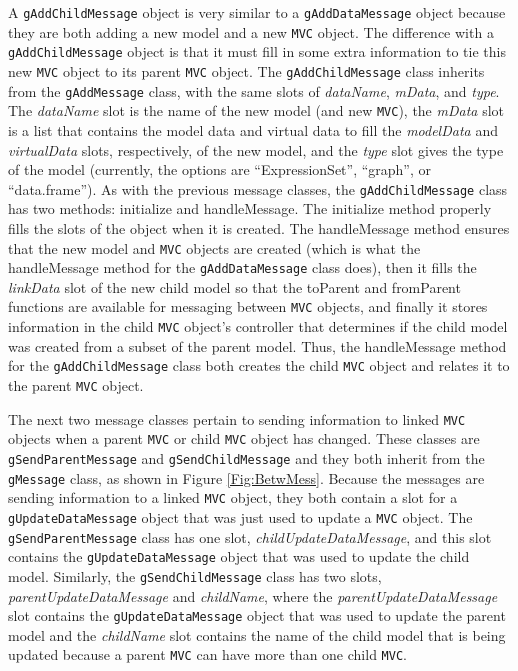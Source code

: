 \documentclass{article}[11pt]
\newcommand{\Rfunction}[1]{{\textsf{#1}}}
\newcommand{\Robject}[1]{{\texttt{#1}}}
\newcommand{\Rslot}[1]{\textsl{#1}}
\newcommand{\Rclass}[1]{\texttt{#1}}
\begin{document}
A \Robject{gAddChildMessage} object is very 
similar to a \Robject{gAddDataMessage} object because they are both adding a
new model and a new \Robject{MVC} object.  The difference with a
\Robject{gAddChildMessage} object is that it must fill in some extra
information to tie this new \Robject{MVC} object to its parent \Robject{MVC}
object.  The \Rclass{gAddChildMessage} class inherits from the
\Rclass{gAddMessage} class, with the same slots of \Rslot{dataName},
\Rslot{mData}, and \Rslot{type}.  The \Rslot{dataName} slot is the name of the
new model (and new \Robject{MVC}), the \Rslot{mData} slot is a list that
contains the model data and virtual data to fill the \Rslot{modelData} and
\Rslot{virtualData} slots, respectively, of the new model, and the
\Rslot{type} slot gives the type of the model (currently, the options are
``ExpressionSet'', ``graph'', or ``data.frame'').  As with the previous
message classes, the \Rclass{gAddChildMessage} class has two methods:
\Rfunction{initialize} and \Rfunction{handleMessage}.  The
\Rfunction{initialize} method properly fills the slots of the object when it
is created.  The \Rfunction{handleMessage} method ensures that the new
model and \Robject{MVC} objects are created (which is what the
\Rfunction{handleMessage} method for the \Rclass{gAddDataMessage} class does),
then it fills the \Rslot{linkData} slot of the new child model
so that the \Rfunction{toParent} and \Rfunction{fromParent} functions are
available for messaging between \Robject{MVC} objects, and finally it stores
information in the child \Robject{MVC} object's controller that determines if
the child model was created from a subset of the parent
model.  Thus, the \Rfunction{handleMessage} method for the
\Rclass{gAddChildMessage} class both creates the child \Robject{MVC} object
and relates it to the parent \Robject{MVC} object. 

The next two message classes pertain to sending information to linked
\Robject{MVC} objects when a parent \Robject{MVC} or child \Robject{MVC}
object has changed.  These classes are \Rclass{gSendParentMessage} and
\Rclass{gSendChildMessage} and they both inherit from the \Rclass{gMessage}
class, as shown in Figure \ref{Fig:BetwMess}.  Because the messages are
sending information to a linked \Robject{MVC} object, they both contain a slot
for a \Robject{gUpdateDataMessage} object that was just used to update a
\Robject{MVC} object.  The \Rclass{gSendParentMessage} class has one slot,
\Rslot{childUpdateDataMessage}, and this slot contains the
\Robject{gUpdateDataMessage} object that was used to update the child
model.  Similarly, the \Rclass{gSendChildMessage} class has two
slots, \Rslot{parentUpdateDataMessage} and \Rslot{childName}, where the
\Rslot{parentUpdateDataMessage} slot contains the \Robject{gUpdateDataMessage}
object that was used to update the parent model and the
\Rslot{childName} slot contains the name of the child model that is
being updated because a parent \Robject{MVC} can have more than one child
\Robject{MVC}.  
\end{document}
